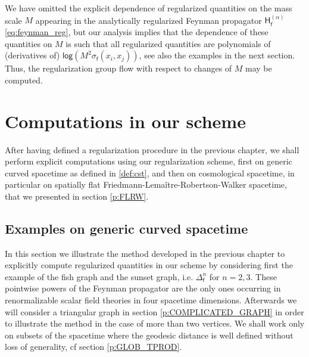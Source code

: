 \documentclass[11pt]{book}
\renewcommand{\log}{\mathsf{log}}
\newcommand{\Hsf}{\mathsf{H}}
\newcommand{\fsf}{\mathsf{f}}
\theoremstyle{break}
\begin{document}
\bigskip


We have omitted the explicit dependence of regularized quantities on the mass scale $M$ appearing in the analytically regularized Feynman propagator $\Hsf^{(\alpha)}_\fsf$ \eqref{eq:feynman_reg}, but our analysis implies that the dependence of these quantities on $M$ is such that all regularized quantities are polynomials of (derivatives of) $\log\left( M^2 \sigma_\fsf(x_i,x_j)\right)$, see also the examples in the next section. Thus, the regularization group flow with respect to changes of $M$ may be computed.


\chapter{Computations in our scheme}
\label{p:EXOS}


After having defined a regularization procedure in the previous chapter, we shall perform explicit computations using our regularization scheme, first on generic curved spacetime as defined in \ref{def:cst}, and then on cosmological spacetime, in particular on spatially flat Friedmann-Lemaître-Robertson-Walker spacetime, that we presented in section \ref{p:FLRW}.


\section{Examples on generic curved spacetime}


In this section we illustrate the method developed in the previous chapter to explicitly compute regularized quantities in our scheme by considering first the example of the fish graph and the sunset graph, i.e. $\Delta^n_\fsf$ for $n=2,3$. These pointwise powers of the Feynman propagator are the only ones occurring in renormalizable scalar field theories in four spacetime dimensions. Afterwards we will consider a triangular graph in section \ref{p:COMPLICATED_GRAPH} in order to illustrate the method in the case of more than two vertices. We shall work only on subsets of the spacetime where the geodesic distance is well defined without loss of generality, cf section \ref{p:GLOB_TPROD}.


\end{document}
